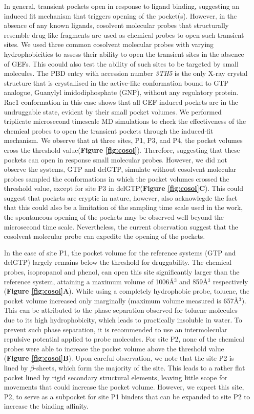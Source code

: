 \documentclass[12pt,a4paper]{achemso}
\begin{document}
In general, transient pockets open in response to ligand binding, suggesting an induced fit mechanism that triggers opening of the pocket(s). However, in the absence of any known ligands, cosolvent molecular probes that structurally resemble drug-like fragments are used as chemical probes to open such transient sites. We used three common cosolvent molecular probes with varying hydrophobicities to assess their ability to open the transient sites in the absence of GEFs. This coould also test the ability of such sites to be targeted by small molecules. The PBD entry with accession number \emph{3TH5} is the only X-ray crystal structure that is crystallised in the active-like conformation bound to GTP analogue, Guanylyl imidodiphosphate (GNP), without any regulatory protein. Rac1 conformation in this case shows that all GEF-induced pockets are in the undruggable state, evident by their small pocket volumes. We performed triplicate microsecond timescale MD simulations to check the effectiveness of the chemical probes to open the transient pockets through the induced-fit mechanism. We observe that at three sites, P1, P3, and P4, the pocket volumes cross the threshold value(\textbf{Figure \ref{fig:cosol}}).  Therefore, suggesting that these pockets can open in response small molecular probes. However, we did not observe the systems, GTP and delGTP, simulate without cosolvent molecular probes sampled the conformations in which the pocket volumes crossed the threshold value, except for site P3 in delGTP(\textbf{Figure \ref{fig:cosol}C}). This could suggest that pockets are cryptic in nature, however, also acknowlegde the fact that this could also be a limitation of the sampling time scale used in the work, the spontaneous opening of the pockets may be observed well beyond the microsecond time scale.  Nevertheless, the current observation suggest that the cosolvent molecular probe can expedite the opening of the pockets.

In the case of site P1, the pocket volume for the reference systems (GTP and delGTP) largely remains below the threshold for druggability. The chemical probes, isopropanol and phenol, can open this site significantly larger than the reference system, attaining a maximum volume of 1006\r{A}$^3$ and  859\r{A}$^3$ respectively (\textbf{Figure \ref{fig:cosol}A}). While using a completely hydrophobic probe, toluene, the pocket volume increased only marginally (maximum volume measured is 657\r{A}$^3$). This can be attributed to the phase separation observed for toluene molecules due to its high hydrophobicity, which leads to practically insoluble in water. To prevent such phase separation, it is recommended to use an intermolecular repulsive potential applied to probe molecules\cite{cosolvkit}. For site P2, none of the chemical probes were able to increase the pocket volume above the threshold value (\textbf{Figure \ref{fig:cosol}B}). Upon careful observation, we note that the site P2 is lined by $\beta$-sheets, which form the majority of the site. This leads to a rather flat pocket lined by rigid secondary structural elements, leaving little scope for movements that could increase the pocket volume. However, we expect this site, P2, to serve as a subpocket for site P1 binders that can be expanded to site P2 to increase the binding affinity. 
\end{document}
